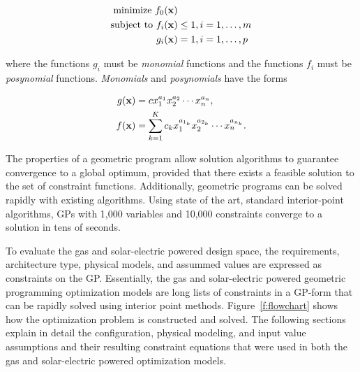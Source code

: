 \begin{align} 
\label{e:gpform}
\text{minimize } f_0(\bold{x}) & \nonumber \\
\text{subject to  } f_i(\bold{x}) &\leq 1, i=1,\ldots,m \\
g_i (\bold{x}) &= 1, i = 1,\ldots,p 
\end{align}

where the functions $g_i$ must be \emph{monomial} functions and the functions $f_i$ must be \emph{posynomial} functions. \emph{Monomials} and \emph{posynomials} have the forms

\begin{align}
 \label{e:mon}
g(\bold{x}) &= c x_1^{a_1} x_2^{a_2} \dotsm x_n^{a_n} , \\
\label{e:pos}
f(\bold{x}) &= \displaystyle\sum_{k=1}^K c_k x_1^{a_{1_k}} x_2^{a_{2_k}} \dotsm x_n^{a_{n_k}}.
\end{align}

The properties of a geometric program allow solution algorithms to guarantee convergence to a global optimum, provided that there exists a feasible solution to the set of constraint functions.  
Additionally, geometric programs can be solved rapidly with existing algorithms.  
Using state of the art, standard interior-point algorithms, GPs with 1,000 variables and 10,000 constraints converge to a solution in tens of seconds.\cite{gp}  

To evaluate the gas and solar-electric powered design space, the requirements, architecture type, physical models, and assummed values are expressed as constraints on the GP.\cite{hoburgthesis} 
Essentially, the gas and solar-electric powered geometric programming optimization models are long lists of constraints in a GP-form that can be rapidly solved using interior point methods.  
Figure~\ref{f:flowchart} shows how the optimization problem is constructed and solved. 
The following sections explain in detail the configuration, physical modeling, and input value assumptions and their resulting constraint equations that were used in both the gas and solar-electric powered optimization models.

